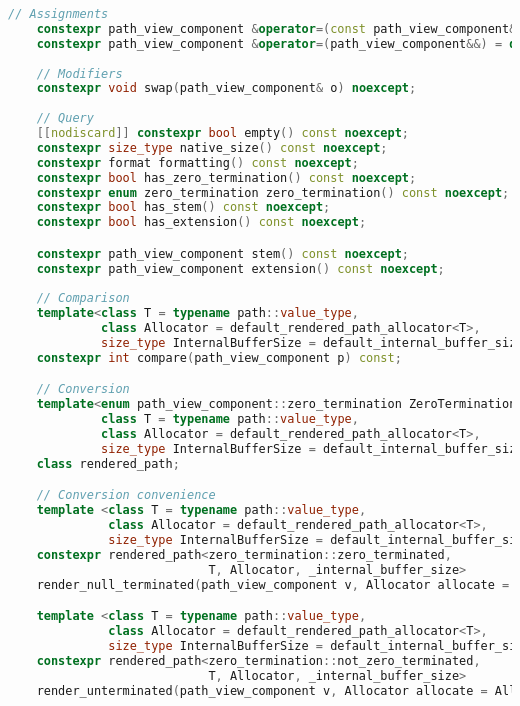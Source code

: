 \documentclass[11pt]{article}
\begin{document}
\begin{lstlisting}[language=cpp]
    // Assignments
    constexpr path_view_component &operator=(const path_view_component&) = default;
    constexpr path_view_component &operator=(path_view_component&&) = default;
    
    // Modifiers
    constexpr void swap(path_view_component& o) noexcept;
    
    // Query
    [[nodiscard]] constexpr bool empty() const noexcept;
    constexpr size_type native_size() const noexcept;
    constexpr format formatting() const noexcept;
    constexpr bool has_zero_termination() const noexcept;
    constexpr enum zero_termination zero_termination() const noexcept;
    constexpr bool has_stem() const noexcept;
    constexpr bool has_extension() const noexcept;

    constexpr path_view_component stem() const noexcept;
    constexpr path_view_component extension() const noexcept;
    
    // Comparison
    template<class T = typename path::value_type,
             class Allocator = default_rendered_path_allocator<T>,
             size_type InternalBufferSize = default_internal_buffer_size>
    constexpr int compare(path_view_component p) const;

    // Conversion
    template<enum path_view_component::zero_termination ZeroTermination,
             class T = typename path::value_type,
             class Allocator = default_rendered_path_allocator<T>,
             size_type InternalBufferSize = default_internal_buffer_size>
    class rendered_path;

    // Conversion convenience
    template <class T = typename path::value_type,
              class Allocator = default_rendered_path_allocator<T>,
              size_type InternalBufferSize = default_internal_buffer_size>
    constexpr rendered_path<zero_termination::zero_terminated,
                            T, Allocator, _internal_buffer_size>
    render_null_terminated(path_view_component v, Allocator allocate = Allocator());

    template <class T = typename path::value_type,
              class Allocator = default_rendered_path_allocator<T>,
              size_type InternalBufferSize = default_internal_buffer_size>
    constexpr rendered_path<zero_termination::not_zero_terminated,
                            T, Allocator, _internal_buffer_size>
    render_unterminated(path_view_component v, Allocator allocate = Allocator());



\end{lstlisting}
\end{document}
